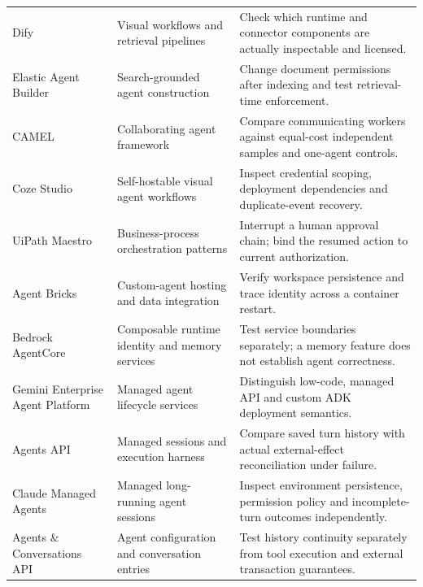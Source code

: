 \begin{longtable}{L{25mm}L{35mm}L{48mm}}
Dify\cite{executionproduct066} & Visual workflows and retrieval pipelines & Check which runtime and connector components are actually inspectable and licensed. \\
Elastic Agent Builder\cite{executionproduct068} & Search-grounded agent construction & Change document permissions after indexing and test retrieval-time enforcement. \\
CAMEL\cite{executionproduct071} & Collaborating agent framework & Compare communicating workers against equal-cost independent samples and one-agent controls. \\
Coze Studio\cite{executionproduct082} & Self-hostable visual agent workflows & Inspect credential scoping, deployment dependencies and duplicate-event recovery. \\
UiPath Maestro\cite{executionproduct018} & Business-process orchestration patterns & Interrupt a human approval chain; bind the resumed action to current authorization. \\
Agent Bricks\cite{executionproduct042} & Custom-agent hosting and data integration & Verify workspace persistence and trace identity across a container restart. \\
Bedrock AgentCore\cite{executionproduct043} & Composable runtime identity and memory services & Test service boundaries separately; a memory feature does not establish agent correctness. \\
Gemini Enterprise Agent Platform\cite{executionproduct044} & Managed agent lifecycle services & Distinguish low-code, managed API and custom ADK deployment semantics. \\
Agents API\cite{executionproduct060} & Managed sessions and execution harness & Compare saved turn history with actual external-effect reconciliation under failure. \\
Claude Managed Agents\cite{executionproduct061} & Managed long-running agent sessions & Inspect environment persistence, permission policy and incomplete-turn outcomes independently. \\
Agents \& Conversations API\cite{executionproduct089} & Agent configuration and conversation entries & Test history continuity separately from tool execution and external transaction guarantees. \\
\bottomrule\end{longtable}
\endgroup
